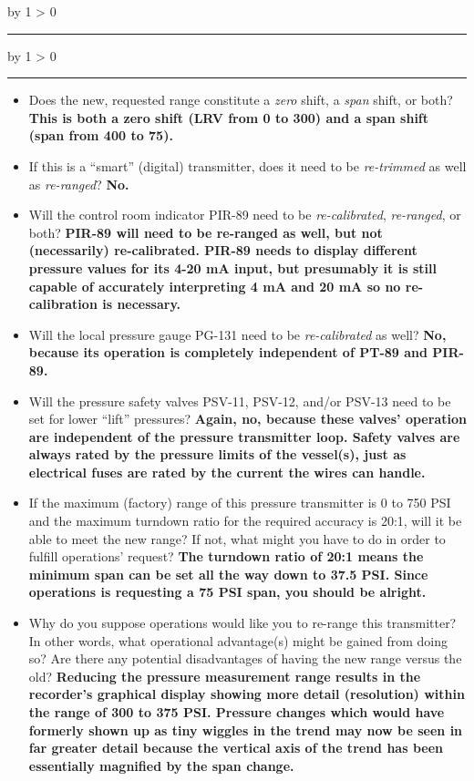 \documentclass[12pt,a4paper]{article}
\def\svar{
           \advance\answnum by 1
           \ifnum \answnum > 0
                \hrule
                \vskip 3pt
                \leftline{Svar \the\answnum}
                \vskip 3pt \fi}
\def\notes{
           \advance\explnum by 1
           \ifnum \explnum > 0
                \hrule
                \vskip 3pt
                \leftline{Notes \the\explnum}
                \vskip 3pt \fi}
\begin{document}
\vskip 10pt \filbreak 





\svar{} 


\vskip 10pt \filbreak 





\notes{} 

\begin{itemize}
\item{} Does the new, requested range constitute a {\it zero} shift, a {\it span} shift, or both?  {\bf This is both a zero shift (LRV from 0 to 300) and a span shift (span from 400 to 75).}
\vskip 10pt
\item{} If this is a ``smart'' (digital) transmitter, does it need to be {\it re-trimmed} as well as {\it re-ranged}?  {\bf No.}
\vskip 10pt
\item{} Will the control room indicator PIR-89 need to be {\it re-calibrated}, {\it re-ranged}, or both? {\bf PIR-89 will need to be re-ranged as well, but not (necessarily) re-calibrated.  PIR-89 needs to display different pressure values for its 4-20 mA input, but presumably it is still capable of accurately interpreting 4 mA and 20 mA so no re-calibration is necessary.}
\vskip 10pt
\item{} Will the local pressure gauge PG-131 need to be {\it re-calibrated} as well?  {\bf No, because its operation is completely independent of PT-89 and PIR-89.}
\vskip 10pt
\item{} Will the pressure safety valves PSV-11, PSV-12, and/or PSV-13 need to be set for lower ``lift'' pressures? {\bf Again, no, because these valves' operation are independent of the pressure transmitter loop.  Safety valves are always rated by the pressure limits of the vessel(s), just as electrical fuses are rated by the current the wires can handle.}
\vskip 10pt
\item{} If the maximum (factory) range of this pressure transmitter is 0 to 750 PSI and the maximum turndown ratio for the required accuracy is 20:1, will it be able to meet the new range?  If not, what might you have to do in order to fulfill operations' request? {\bf The turndown ratio of 20:1 means the minimum span can be set all the way down to 37.5 PSI.  Since operations is requesting a 75 PSI span, you should be alright.}
\vskip 10pt
\item{} Why do you suppose operations would like you to re-range this transmitter?  In other words, what operational advantage(s) might be gained from doing so?  Are there any potential disadvantages of having the new range versus the old? {\bf Reducing the pressure measurement range results in the recorder's graphical display showing more detail (resolution) within the range of 300 to 375 PSI.  Pressure changes which would have formerly shown up as tiny wiggles in the trend may now be seen in far greater detail because the vertical axis of the trend has been essentially magnified by the span change.}
\end{itemize}
\end{document}
